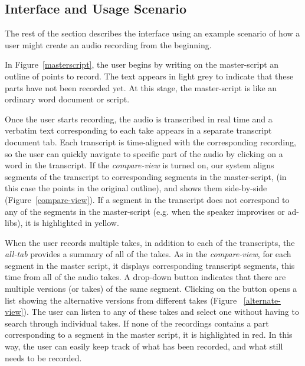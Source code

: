 \subsection{Interface and Usage Scenario}
The rest of the section describes the interface using an example scenario of how a user might create an audio recording from the beginning. 

In Figure~\ref{masterscript}, the user begins by writing on the master-script an outline  of points to record. The text appears in light grey to indicate that these parts have not been recorded yet. At this stage, the master-script is like an ordinary
word document or script. 

Once the user starts recording, the audio is transcribed in real time and a verbatim text corresponding to each take appears in a separate transcript document tab. Each transcript is time-aligned with the corresponding recording, so the user can quickly navigate to specific
part of the audio by clicking on a word in the transcript. If the \textit{compare-view} is turned on, our system aligns segments of the transcript to corresponding segments in the master-script, (in this case the points in the original outline), and shows them side-by-side (Figure~\ref{compare-view}). If a segment in the transcript does not correspond to any of the segments in the master-script (e.g. when the speaker improvises or ad-libs), it is highlighted in yellow.


When the user records multiple takes, in addition to each of the transcripts, the \textit{all-tab} provides a summary of all of the takes. As in the \textit{compare-view}, for each segment in the master script, it displays corresponding transcript segments, this time from all of the audio takes. A drop-down button indicates that there are multiple versions (or takes) of the same segment. Clicking on the button opens a
list showing the alternative versions from different takes (Figure ~\ref{alternate-view}). The user can listen to any of these takes and select one without having to search through individual takes. If none of the recordings contains a part corresponding to a segment in the master script, it is highlighted in red. In this way, the user can easily keep track of what has been recorded, and what still needs to be recorded.  

